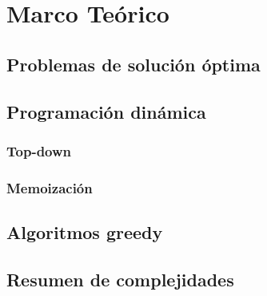 \chapter{Marco Teórico}

\section{Problemas de solución óptima}

\section{Programación dinámica}

\subsection{Top-down}

\subsection{Memoización}

\section{Algoritmos greedy}

\section{Resumen de complejidades}